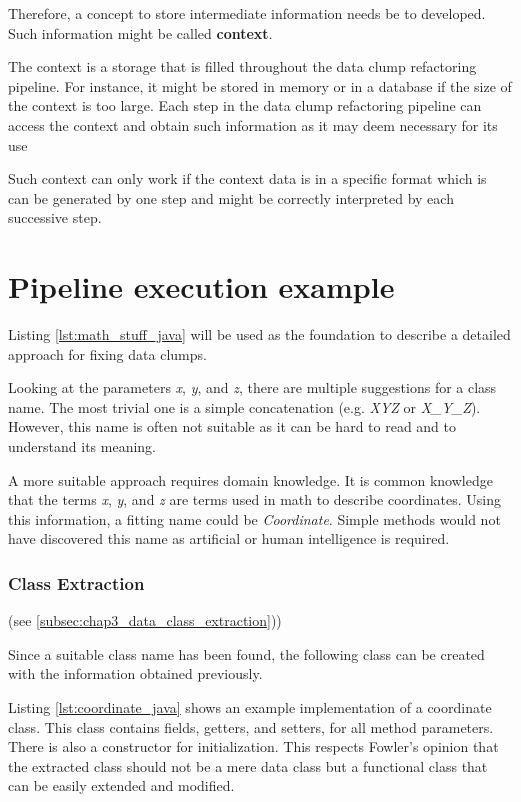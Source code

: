 Therefore, a concept to store intermediate information needs be to developed. Such information might be called \textbf{context}.

The context is a storage that is filled throughout the data clump refactoring pipeline. For instance, it might be stored in memory or in a database if the size of the context is too large. Each step in the data clump refactoring pipeline can access the context and obtain such information as it may deem necessary for its use

Such context can only work if the context data is in a specific format which is can be generated by one step and might be correctly interpreted by each successive step. 



\section{Pipeline execution example}
Listing \ref{lst:math_stuff_java} will be used as the foundation to describe a detailed approach for fixing data clumps.

Looking at the parameters \textit{x}, \textit{y}, and \textit{z}, there are multiple suggestions for a class name. The most trivial one is a simple concatenation  (e.g. \textit{XYZ} or \textit{X\_Y\_Z}). However, this name is often not suitable as it can be hard to read and to understand its meaning.

A more suitable approach requires domain knowledge. It is common knowledge that the terms \textit{x}, \textit{y}, and \textit{z} are terms used in math to describe coordinates. Using this information, a fitting name could be \textit{Coordinate}. Simple methods would not have discovered this name as artificial or human intelligence is required. 

\subsubsection{Class Extraction} (see \ref{subsec:chap3_data_class_extraction}))

Since a suitable class name has been found, the following class can be created with the information obtained previously. 

Listing \ref{lst:coordinate_java} shows an example implementation of a coordinate class. This class contains fields, getters, and setters, for all method parameters. There is also a constructor for initialization. This respects Fowler's opinion that the extracted class should not be a mere data class but a functional class that can be easily extended and modified.









\hfill
